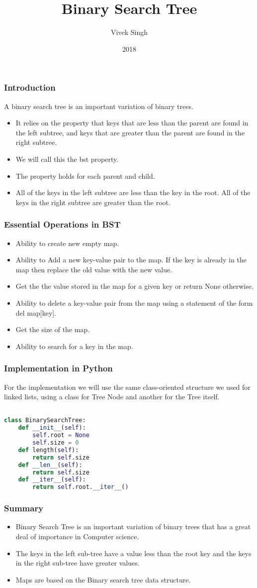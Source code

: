 \documentclass{beamer}
\title{Binary Search Tree}
\author{Vivek Singh}
\institute{Information Systems Decision Sciences (ISDS)\\
MUMA College of Business\\
University of South Florida \\
Tampa, Florida}
\date{2018}
\begin{document}
\frame{\titlepage}
\begin{frame}
\frametitle{Introduction}
A binary search tree is an important variation of binary trees.
\begin{itemize}
\item It relies on the property that keys that are less than the parent are found in the left subtree, and keys that are greater than the parent are found in the right subtree. 
\item We will call this the bst property.
\item The property holds for each parent and child. 
\item All of the keys in the left subtree are less than the key in the root. All of the keys in the right subtree are greater than the root.
\end{itemize}
\end{frame}

\begin{frame}
\frametitle{Essential Operations in BST}
\begin{itemize}
\item Ability to create new empty map.
\item Ability to Add a new key-value pair to the map. If the key is already in the map then replace the old value with the new value.
\item Get the the value stored in the map for a given key or return None otherwise.
\item Ability to delete a key-value pair from the map using a statement of the form del map[key].
\item Get the size of the map.
\item Ability to search for a key in the map.
\end{itemize}
\end{frame}

\begin{frame}[fragile]
\frametitle{Implementation in Python}
For the implementation we will use the same class-oriented structure we used for linked lists, using a class for Tree Node and another for the Tree itself.
\begin{lstlisting}[language=Python]

class BinarySearchTree:
    def __init__(self):
        self.root = None
        self.size = 0
    def length(self):
        return self.size
    def __len__(self):
        return self.size
    def __iter__(self):
        return self.root.__iter__()
\end{lstlisting}
\end{frame}

\begin{frame}
\frametitle{Summary}
\begin{itemize}
\item Binary Search Tree is an important variation of binary trees that has a great deal of importance in Computer science.
\item The keys in the left sub-tree have a value less than the root key and the keys in the right sub-tree have greater values.
\item Maps are based on the Binary search tree data structure.
\end{itemize}
\end{frame}
\end{document}
